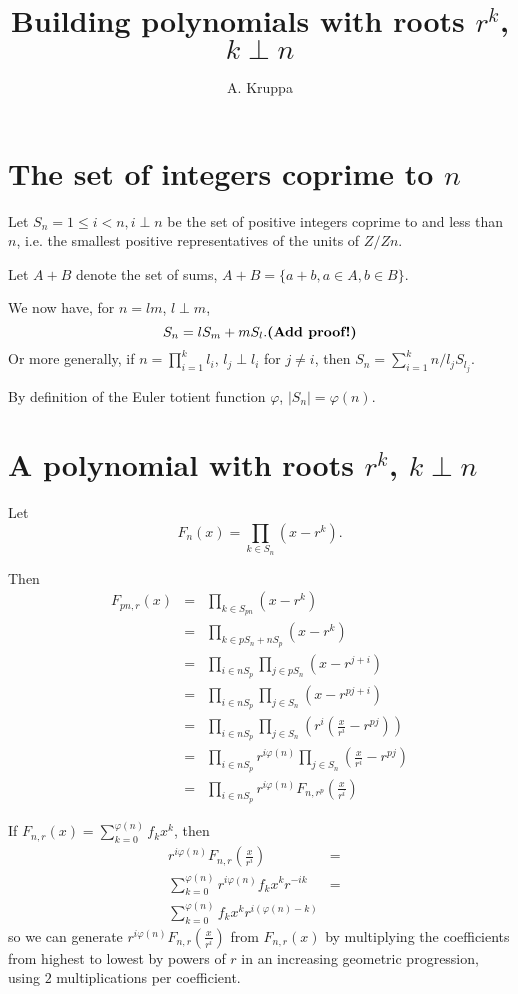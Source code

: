 \documentclass{article}
\begin{document}
\title{Building polynomials with roots $r^k$, $k\perp n$}
\author{A. Kruppa}
\maketitle


\section{The set of integers coprime to $n$}
Let $S_n = {1 \leq i < n, i \perp n}$ be the set of positive integers coprime 
to and less than $n$, i.e. the smallest positive representatives of the units 
of $Z/Zn$.

Let $A + B$ denote the set of sums, $A + B = \{a+b, a\in A, b\in B\}$.

We now have, for $n = lm$, $l \perp m$, 
\begin{displaymath}
S_n = lS_m + mS_l. \textrm{\bf (Add proof!)}
\end{displaymath}
Or more generally, if $n = \prod_{i=1}^{k} l_i$, $l_j \perp l_i$ for 
$j \neq i$, then $S_n = \sum_{i=1}^{k} n/l_jS_{l_j}$.

By definition of the Euler totient function $\varphi$, $|S_n| = \varphi(n)$.

\section{A polynomial with roots $r^k$, $k\perp n$}
Let
\begin{displaymath}
F_n(x) = \prod_{k \in S_n} (x-r^k).
\end{displaymath}

Then
\begin{eqnarray*}
F_{pn,r}(x) & = & \prod_{k \in S_{pn}} \left(x-r^k\right) \\
            & = & \prod_{k \in pS_n + nS_p} \left(x-r^k\right) \\
            & = & \prod_{i \in nS_p} \prod_{j \in pS_n} \left(x-r^{j+i}\right) \\
            & = & \prod_{i \in nS_p} \prod_{j \in S_n} \left(x-r^{pj+i}\right) \\
            & = & \prod_{i \in nS_p} \prod_{j \in S_n} \left(r^i \left(\frac{x}{r^i}-r^{pj}\right)\right) \\
            & = & \prod_{i \in nS_p} r^{i\varphi(n)} \prod_{j \in S_n} \left(\frac{x}{r^i}-r^{pj}\right) \\
            & = & \prod_{i \in nS_p} r^{i\varphi(n)} F_{n,r^p}\left(\frac{x}{r^i}\right)
\end{eqnarray*}

If $F_{n,r}(x) = \sum_{k=0}^{\varphi(n)} f_k x^k$, then 
\begin{eqnarray*}
r^{i\varphi(n)} F_{n,r}\left(\frac{x}{r^i}\right) & = &\\
\sum_{k=0}^{\varphi(n)} r^{i\varphi(n)} f_k x^k r^{-ik} & = & \\
\sum_{k=0}^{\varphi(n)} f_k x^k r^{i(\varphi(n)-k)} &&
\end{eqnarray*}
so we can generate $r^{i\varphi(n)} F_{n,r}\left(\frac{x}{r^i}\right)$ from 
$F_{n,r}(x)$ by multiplying the coefficients from highest to lowest by powers 
of $r$ in an increasing geometric progression, using $2$ multiplications 
per coefficient.
\end{document}
